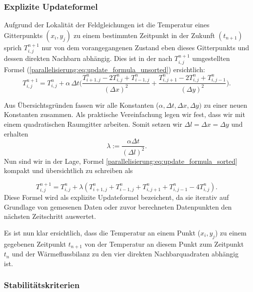 \subsubsection{Explizite Updateformel}
\label{parallelisierung:sec:update_formel}


Aufgrund der Lokalität der Feldgleichungen ist die Temperatur eines Gitterpunkts \( (x_i, y_j)\) zu einem bestimmten Zeitpunkt in der Zukunft \( (t_{n+1})\) sprich \(T_{i,j}^{n+1}\) nur von dem  vorangegangenen Zustand eben dieses Gitterpunkts und dessen direkten Nachbarn abhängig.
Dies ist  in der nach \(T_{i,j}^{n+1}\) umgestellten Formel (\ref{parallelisierung:eq:update_formula_unsorted}) ersichtlich:
\begin{equation}
	\label{parallelisierung:eq:update_formula_sorted}
	T_{i,j}^{n+1}
	=
	T_{i,j}^n
	+
	\alpha \, \Delta t \biggl(
	\frac{T_{i+1,j}^n - 2 T_{i,j}^n + T_{i-1,j}^n}{(\Delta x)^2}
	+
	\frac{T_{i,j+1}^n - 2 T_{i,j}^n + T_{i,j-1}^n}{(\Delta y)^2}
	\biggr).
\end{equation}

Aus Übersichtsgründen fassen wir alle Konstanten (\(\alpha, \Delta t, \Delta x, \Delta y) \) zu einer neuen Konstanten zusammen.
Als praktische Vereinfachung legen wir fest, dass wir mit einem quadratischen Raumgitter arbeiten. Somit setzen wir  \(\Delta l = \Delta x = \Delta y\) und erhalten
\begin{equation}
	\label{parallelisierung:eq:lambda}
	\lambda 
	:= 
	\frac{\alpha \Delta t}{(\Delta l)^2}.
\end{equation}
Nun sind wir in der Lage, Formel \eqref{parallelisierung:eq:update_formula_sorted} kompakt und übersichtlich zu schreiben als

\begin{equation}
	\label{parallelisierung:eq:update_formel}
	T_{i,j}^{n+1}
	=
	T_{i,j}^n +
	\lambda \left(
	T_{i+1,j}^n + T_{i-1,j}^n + T_{i,j+1}^n + T_{i,j-1}^n - 4 T_{i,j}^n
	\right).
\end{equation}
Diese Formel wird als explizite Updateformel bezeichent, da sie iterativ auf Grundlage von gemesenen Daten oder zuvor berechneten Datenpunkten den nächsten Zeitschritt auswertet.

Es ist nun klar ersichtlich, dass die Temperatur an einem Punkt (\(x_i, y_j\)) zu einem gegebenen Zeitpunkt \(t_{n+1}\)  von der Temperatur an diesem Punkt zum Zeitpunkt \(t_n\) und der Wärmeflussbilanz zu den vier direkten Nachbarquadraten abhängig ist.

\subsubsection{Stabilitätskriterien}

